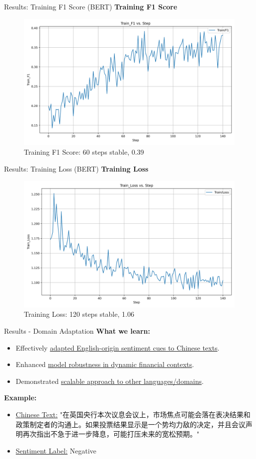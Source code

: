 \documentclass[aspectratio=169]{beamer}
\begin{document}
\begin{frame}{Results: Training F1 Score (BERT)}
  \textbf{Training F1 Score}
  \begin{figure}
    \centering
    \includegraphics[width=0.6\linewidth]{BERT_Train_F1.png}
    \caption{\small Training F1 Score: 60 steps stable, 0.39}
  \end{figure}
\end{frame}

\begin{frame}{Results: Training Loss (BERT)}
  \textbf{Training Loss}
  \begin{figure}
    \centering
    \includegraphics[width=0.6\linewidth]{BERT_Train_Loss.png}
    \caption{\small Training Loss: 120 steps stable, 1.06}
  \end{figure}
\end{frame}

\begin{frame}{Results - Domain Adaptation}
\textbf{What we learn:}
  \begin{itemize}
    \item Effectively \underline{adapted English-origin sentiment cues to Chinese texts}.
    \item Enhanced \underline{model robustness in dynamic financial contexts}.
    \item Demonstrated \underline{scalable approach to other languages/domains}.
  \end{itemize}
\textbf{Example:}
  \begin{itemize}
    \item \underline{Chinese Text:} "在英国央行本次议息会议上，市场焦点可能会落在表决结果和政策制定者的沟通上。如果投票结果显示是一个势均力敌的决定，并且会议声明再次指出不急于进一步降息，可能打压未来的宽松预期。"
    \item \underline{Sentiment Label:} Negative
  \end{itemize}
\end{frame}
\end{document}
